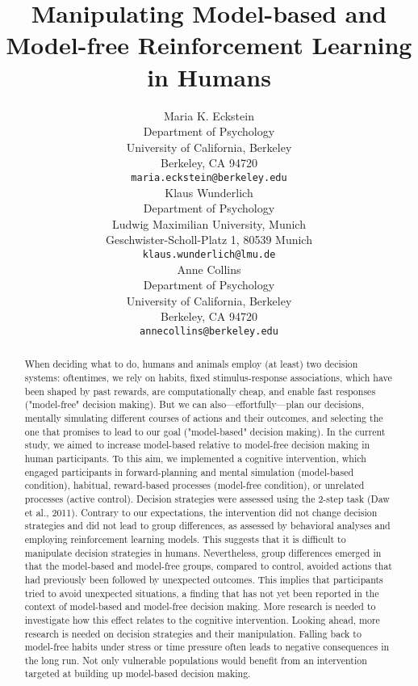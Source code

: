 \documentclass[11pt]{article} %
\title{Manipulating Model-based and Model-free Reinforcement Learning in Humans}
\author{
Maria K. Eckstein \\
Department of Psychology \\
University of California, Berkeley \\
Berkeley, CA 94720 \\
\texttt{maria.eckstein@berkeley.edu} \\
\And
Klaus Wunderlich \\
Department of Psychology \\
Ludwig Maximilian University, Munich \\
Geschwister-Scholl-Platz 1, 80539 Munich \\
\texttt{klaus.wunderlich@lmu.de} \\
\And
Anne Collins \\
Department of Psychology\\
University of California, Berkeley \\
Berkeley, CA 94720  \\
\texttt{annecollins@berkeley.edu} \\
}
\begin{document}
\maketitle

\begin{abstract}
When deciding what to do, humans and animals employ (at least) two decision systems: oftentimes, we rely on habits, fixed stimulus-response associations, which have been shaped by past rewards, are computationally cheap, and enable fast responses ("model-free" decision making). But we can also---effortfully---plan our decisions, mentally simulating different courses of actions and their outcomes, and selecting the one that promises to lead to our goal ("model-based" decision making). In the current study, we aimed to increase model-based relative to model-free decision making in human participants. To this aim, we implemented a cognitive intervention, which engaged participants in forward-planning and mental simulation (model-based condition), habitual, reward-based processes (model-free condition), or unrelated processes (active control). Decision strategies were assessed using the 2-step task (Daw et al., 2011). Contrary to our expectations, the intervention did not change decision strategies and did not lead to group differences, as assessed by behavioral analyses and employing reinforcement learning models. This suggests that it is difficult to manipulate decision strategies in humans. Nevertheless, group differences emerged in that the model-based and model-free groups, compared to control, avoided actions that had previously been followed by unexpected outcomes. This implies that participants tried to avoid unexpected situations, a finding that has not yet been reported in the context of model-based and model-free decision making. More research is needed to investigate how this effect relates to the cognitive intervention. Looking ahead, more research is needed on decision strategies and their manipulation. Falling back to model-free habits under stress or time pressure often leads to negative consequences in the long run. Not only vulnerable populations would benefit from an intervention targeted at building up model-based decision making. 
\end{abstract}


\end{document}
